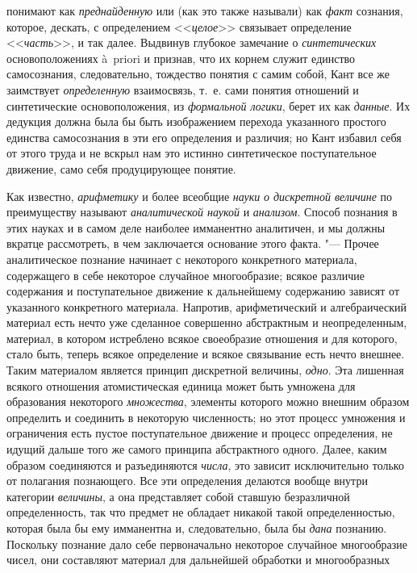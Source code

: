 понимают как {\em преднайденную}
или (как это также называли) как
{\em факт} сознания,
которое, дескать, с определением
<<{\em целое}>> связывает
определение <<{\em часть}>>,
и так далее. Выдвинув глубокое замечание о
{\em синтетических}
основоположениях à~priori и признав, что их корнем служит
единство самосознания, следовательно, тождество понятия с самим собой, Кант
все же заимствует {\em определенную}
взаимосвязь, т.~е. сами понятия отношений и синтетические
основоположения, из {\em формальной
логики}, берет их как
{\em данные}. Их дедукция
должна была бы быть изображением перехода указанного простого единства
самосознания в эти его определения и различия; но Кант избавил себя от
этого труда и не вскрыл нам это истинно синтетическое поступательное
движение, само себя продуцирующее понятие.

Как известно,
{\em арифметику} и более
всеобщие {\em науки}
{\em о дискретной величине}
по преимуществу называют
{\em аналитической наукой}
и {\em анализом}.
Способ познания в этих науках и в самом деле наиболее
имманентно аналитичен, и мы должны вкратце рассмотреть, в чем заключается
основание этого факта. "--- Прочее аналитическое познание
начинает с некоторого конкретного материала, содержащего в себе некоторое
случайное многообразие; всякое различие содержания и поступательное
движение к дальнейшему содержанию зависят от указанного конкретного
материала. Напротив, арифметический и алгебраический материал есть нечто
уже сделанное совершенно абстрактным и неопределенным, материал, в котором
истреблено всякое своеобразие отношения и для которого, стало быть, теперь
всякое определение и всякое связывание есть нечто внешнее. Таким
материалом является принцип дискретной величины,
{\em одно}. Эта лишенная
всякого отношения атомистическая единица может быть умножена для
образования некоторого {\em множества},
элементы которого можно внешним образом определить и
соединить в некоторую численность; но этот процесс умножения и ограничения
есть пустое поступательное движение и процесс определения, не идущий дальше
того же самого принципа абстрактного одного. Далее, каким образом
соединяются и разъединяются
{\em числа}, это зависит
исключительно только от полагания познающего. Все эти определения делаются
вообще внутри категории {\em величины},
а она представляет собой ставшую безразличной определенность,
так что предмет не обладает никакой такой определенностью, которая была бы
ему имманентна и, следовательно, была бы
{\em дана} познанию.
Поскольку познание дало себе первоначально некоторое случайное многообразие
чисел, они составляют материал для дальнейшей обработки и многообразных
